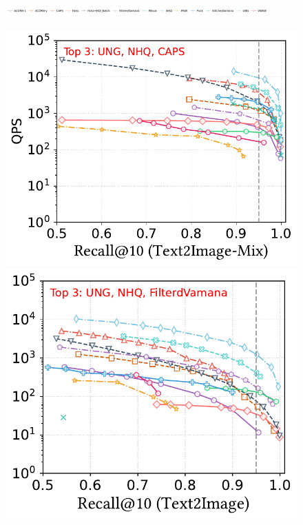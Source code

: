 \documentclass[sigconf, nonacm]{acmart}
\begin{document}
{	%
	

\begin{figure}
	\centering
	
	\includegraphics[width=0.9\textwidth]{figures/exp/attribute_legend.pdf}
	
	\begin{minipage}[t]{0.36\textwidth}
		\centering
		
		\includegraphics[width=0.495\linewidth]{figures/exp/attribute_multimodel.pdf}
		\hfill 
		\includegraphics[width=0.47\linewidth]{figures/exp/attribute_multimodel_1.pdf}
		

\end{minipage}
\end{figure}}
\end{document}

